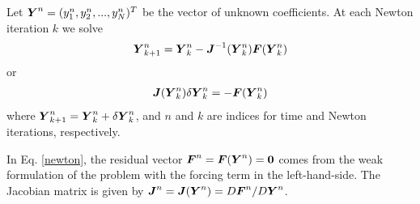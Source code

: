 Let $\boldsymbol{Y}^n = (y_1^n,y_2^n,...,y_N^n)^T$ be the vector of unknown coefficients.  At each Newton iteration $k$ we solve
\begin{align}
  \boldsymbol{Y}_{k+1}^{n} = \boldsymbol{Y}_{k}^{n} 
  - \boldsymbol{J}^{-1}(\boldsymbol{Y}_{k}^{n}) \boldsymbol{F}(\boldsymbol{Y}_{k}^{n})
\end{align}
or
\begin{align}
  \boldsymbol{J}(\boldsymbol{Y}_{k}^{n}) \delta\boldsymbol{Y}_{k}^{n} = - \boldsymbol{F}(\boldsymbol{Y}_{k}^{n}) \label{newton}
\end{align}
where $\boldsymbol{Y}_{k+1}^{n} = \boldsymbol{Y}_{k}^{n} + \delta\boldsymbol{Y}_{k}^{n}$, and $n$ and $k$ are indices for time and Newton iterations, respectively.

In Eq. \eqref{newton}, the residual vector $\boldsymbol{F}^{n}=\boldsymbol{F}(\boldsymbol{Y}^n)=\boldsymbol{0}$ comes from the weak formulation of the problem with the forcing term in the left-hand-side.  The Jacobian matrix is given by $\boldsymbol{J}^{n}=\boldsymbol{J}(\boldsymbol{Y}^{n})=D\boldsymbol{F}^{n}/D\boldsymbol{Y}^{n}$.
